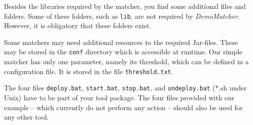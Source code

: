 \documentclass{article}
\def\file#1{\textcolor{grayy}{\texttt{#1}}}
\def\tool#1{\textsl{#1}}
\newcommand\smtt[1]{\texttt{\small #1}}
\begin{document}
Besides the libraries required by the matcher, you find some additional files and folders. 
Some of these folders, such as \smtt{lib}, are not required by \tool{DemoMatcher}. 
However, it is obligatory that these folders exist. 

Some matchers may need additional resources to the required Jar-files. These may be stored in the \smtt{conf} directory which is accessible at runtime.
Our simple matcher has only one parameter, namely its threshold, which can be defined in a configuration file. It is stored in the file \file{threshold.txt}.

The four files \file{deploy.bat}, \file{start.bat}, \file{stop.bat}, and \file{undeploy.bat} (*.sh under Unix) have to be part of your tool package. The four files provided with our example -- which currently do not perform any action -- should also be used for any other tool. 

\end{document}
